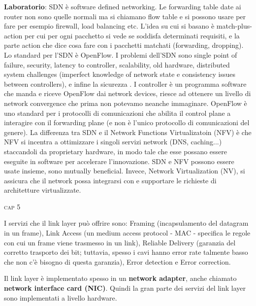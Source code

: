\documentclass[a4paper,10pt]{article} %
\renewcommand{\b}[1]{%
    {\textbf{#1}}}
\begin{document}
\b{Laboratorio}: SDN è software defined networking. Le forwarding table date ai router non sono quelle normali ma si chiamano flow table e si possono usare per fare per esempio firewall, load balancing etc. L'idea su cui si basano è match-plus-action per cui per ogni pacchetto si vede se soddisfa determinati requisiti, e la parte action che dice cosa fare con i pacchetti matchati (forwarding, dropping). Lo standard per l'SDN è OpenFlow. I problemi dell'SDN sono single point of failure, security, latency to controller, scalability, old hardware, distributed system challenges (imperfect knowledge of network state e consistency issues between controllers), e infine la sicurezza . I controller è un programma software che manda e riceve OpenFlow dai network devices, riesce ad ottenere un livello di network convergence che prima non potevamo neanche immaginare. OpenFlow è uno standard per i protocolli di comunicazioni che abilita il control plane a interagire con il forwarding plane (e non è l'unico protocollo di comunicazioni del genere). La differenza tra SDN e il Network Functions Virtualizatoin (NFV) è che NFV si incentra a ottimizzare i singoli servizi network (DNS, caching...) staccandoli da proprietary hardware, in modo tale che esse possano essere eseguite in software per accelerare l'innovazione. SDN e NFV possono essere usate insieme, sono mutually beneficial. Invece, Network Virtualization (NV), si assicura che il network possa integrarsi con e supportare le richieste di architetture virtualizzate. 

\newpage

\vspace{3pt}
\centerline{\textsc{ \normalsize {cap 5}}}
\vspace{3pt}

I servizi che il link layer può offrire sono: Framing (incapsulamento del datagram in un frame), Link Access (un medium access protocol - MAC - specifica le regole con cui un frame viene trasmesso in un link), Reliable Delivery (garanzia del corretto trasporto dei bit; tuttavia, spesso i cavi hanno error rate talmente basso che non c'è bisogno di questa garanzia), Error detection e Error correction.

Il link layer è implementato spesso in un \b{network adapter}, anche chiamato \b{network interface card (NIC)}. Quindi la gran parte dei servizi del link layer sono implementati a livello hardware.
\end{document}
